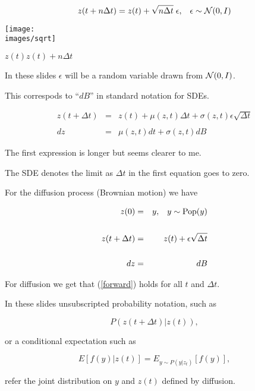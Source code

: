 {\vfill
$$z(t+n\Delta t) = z(t) + \sqrt{n\Delta t}\; \epsilon,\;\;\;\epsilon \sim {\cal N}(0,I)$$

\vfill
\centerline{\texttt{[image: \\images/sqrt]}}

\centerline{$z(t)$\hspace{1.5in}$z(t)+n\Delta t$}

In these slides $\epsilon$ will be a random variable drawn from ${\cal N}(0,I)$.

\vfill
This correspods to ``$dB$'' in standard notation for SDEs.

\vfill
{\huge
\begin{eqnarray*}
  z(t+\Delta t) & = & z(t) + \mu(z,t)\Delta t + \sigma(z,t)\epsilon\sqrt{\Delta t} \\
  \\
  dz & = & \mu(z,t)dt + \sigma(z,t)dB
\end{eqnarray*}
}

\vfill
The first expression is longer but seems clearer to me.

\vfill
The SDE denotes the limit as $\Delta t$ in the first equation goes to zero.


\vfill
For the diffusion process (Brownian motion) we have

\vfill
{\huge
\begin{eqnarray}
  z(0) & = & y,\;\;\;y \sim \mathrm{Pop}(y) \nonumber \\
  \nonumber \\
  z(t+\Delta t) & = & z(t) + \epsilon\sqrt{\Delta t} \label{forward} \\
  \nonumber \\
  dz & = & dB \nonumber
\end{eqnarray}
}

\vfill
For diffusion we get that (\ref{forward}) holds for all $t$ and $\Delta t$.


In these slides unsubscripted probability notation, such as

\vfill
$$P(z(t+\Delta t)|z(t)),$$

\vfill
or a conditional expectation such as

\vfill
$$E[f(y)|z(t)] = E_{y \sim P(y|z_t)}[f(y)],$$

\vfill
refer the joint distribution on $y$ and $z(t)$ defined by diffusion.



}
